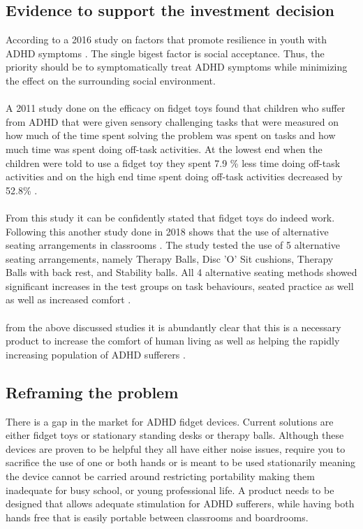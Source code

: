     \subsection{Evidence to support the investment decision}
      According to a 2016 study on factors that promote resilience in youth with
      ADHD symptoms \cite{melissa}. The single bigest factor is social
      acceptance. Thus, the priority should be to symptomatically treat ADHD
      symptoms while minimizing the effect on the surrounding social
      environment. \\ \\
      A 2011 study done on the efficacy on fidget toys found that children who
      suffer from ADHD that were given sensory challenging tasks that were
      measured on how much of the time spent solving the problem was spent on
      tasks and how much time was spent doing off-task activities. At the lowest
      end when the children were told to use a fidget toy they spent 7.9 \% less
      time doing off-task activities and on the high end time spent doing
      off-task activities decreased by 52.8\% \cite{amanda}.  \\ \\
      From this study it can be confidently stated that fidget toys do indeed
      work. Following this another study done in 2018 shows that the use of
      alternative seating arrangements in classrooms  \cite{julaila}
      . The study tested the use of 5 alternative seating arrangements,
      namely Therapy Balls, Disc 'O' Sit cushions, Therapy Balls with back rest,
      and Stability balls. All 4 alternative seating methods showed significant
      increases in the test groups on task behaviours, seated practice as well
      as well as increased comfort \cite{julaila}. \\ \\
      from the above discussed studies it is abundantly clear that this is a
      necessary product to increase the comfort of human living as well as
      helping the rapidly increasing population of ADHD sufferers \cite{elie}.
       

    \subsection{Reframing the problem}
    There is a gap in the market for ADHD fidget devices. Current solutions are
    either fidget toys or stationary standing desks or therapy balls. Although
    these devices are proven to be helpful they all have either noise issues,
    require you to sacrifice the use of one or both hands or is meant to be used
    stationarily meaning the device cannot be carried around restricting
    portability making them inadequate for busy school, or young professional
    life. A product needs to be designed that allows adequate stimulation for
    ADHD sufferers, while having both hands free that is easily portable between
    classrooms and boardrooms.



